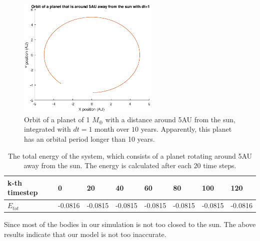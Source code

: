 \begin{figure}[H]
\centering
\includegraphics[width=0.6\textwidth]{Planeet_5AU_dt1_10jaar.eps}
\caption{Orbit of a planet of 1 $M_{\oplus}$ with a distance around 5AU from the sun, integrated with $dt=1$ month over $10$ years. Apparently, this planet has an orbital period longer than 10 years.}
    \label{fig:Planet5AUdt1}
\end{figure}
\begin{table}[htb]
\centering
\caption{The total energy of the system, which consists of a planet rotating around 5AU away from the sun. The energy is calculated after each 20 time steps.}
\begin{tabular}{|l|l|l|l|l|l|l|l|}
\hline
k-th timestep&0&20&40&60&80&100&120\\ \hline
$E_{tot}$&-0.0816&   -0.0815&   -0.0815&   -0.0815&   -0.0815&   -0.0815&   -0.0816\\ \hline
\end{tabular}
\label{tab:Planet5AUEnergy}
\end{table}
Since most of the bodies in our simulation is not too closed to the sun. The above results indicate that our model is not too inaccurate.
